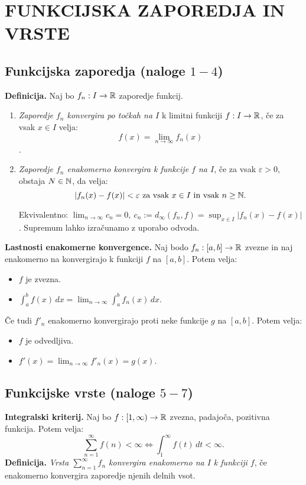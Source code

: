 \section{FUNKCIJSKA ZAPOREDJA IN VRSTE}
{\color{Purple} \subsection*{Funkcijska zaporedja (naloge $1-4$)}}
\textbf{Definicija.} Naj bo $f_n: I \to \mathbb{R}$ zaporedje funkcij.
\begin{enumerate}
    \item \emph{Zaporedje $f_n$ konvergira po točkah na $I$} k limitni funkciji $f: I \to \mathbb{R}$, če za vsak $x \in I$ velja: $$f(x) = \lim_{n \to \infty} f_n (x)$$.
    \item \emph{Zaporedje $f_n$ enakomerno konvergira k funkcije $f$ na $I$}, če za vsak $\varepsilon > 0$, obstaja $N \in \mathbb{N}$, da velja: $$|f_n(x)-f(x)|<\varepsilon \text{ za vsak } x \in I \text{ in vsak } n \geq \mathbb{N}.$$ 
    
    Ekvivalentno: $\lim_{n \to \infty} c_n = 0, \ c_n := d_\infty (f_n, f) = \sup_{x \in I} |f_n(x) - f(x)|$. Supremum lahko izračunamo z uporabo odvoda.
\end{enumerate}
\textbf{Lastnosti enakomerne konvergence.} Naj bodo $f_n: [a,b] \to \mathbb{R}$ zvezne in naj enakomerno na konvergirajo k funkciji $f$ na $[a,b]$. Potem velja:
\begin{itemize}
    \item $f$ je zvezna.
    \item $\displaystyle \int_{a}^{b} f(x) \,dx = \lim_{n \to \infty} \int_{a}^{b} f_n(x) \,dx $.
\end{itemize}
Če tudi $f'_n$ enakomerno konvergirajo proti neke funkcije $g$ na $[a,b]$. Potem velja:
\begin{itemize}
    \item $f$ je odvedljiva.
    \item $f'(x) = \lim_{n \to \infty} f'_n(x) = g(x)$.
\end{itemize}

{\color{Purple} \subsection*{Funkcijske vrste (naloge $5-7$)}}
\textbf{Integralski kriterij.} Naj bo $f:[1, \infty) \to \mathbb{R}$ zvezna, padajoča, pozitivna funkcija. Potem velja: $$\sum_{n=1}^{\infty}f(n) < \infty \Leftrightarrow \int_{1}^{\infty} f(t)  \,dt < \infty.$$
\textbf{Definicija.} \emph{Vrsta $\sum_{n=1}^{\infty}f_n$ konvergira enakomerno na $I$ k funkciji $f$}, če enakomerno konvergira zaporedje njenih delnih vsot.


